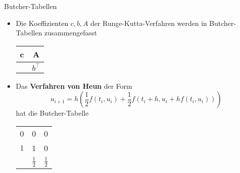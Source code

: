 \begin{frame}{Butcher-Tabellen}
    \begin{itemize}
        \item<1-> Die Koeffizienten $c,b,A$ der Runge-Kutta-Verfahren werden in Butcher-Tabellen zusammengefasst
        \begin{center}
            \begin{tabular}{c | c}
                c & A \\
                \hline
                & $b^{\intercal}$
            \end{tabular}
        \end{center}
        \item Das \textbf{Verfahren von Heun} der Form
        \[
            u_{i+1}=h\left(\frac{1}{2}f(t_i,u_i)+\frac{1}{2}f(t_i+h,u_i+hf(t_i,u_i))\right)
        \]
        hat die Butcher-Tabelle
        \begin{center}
            \begin{tabular}{c | c c}
                0 & 0 & 0 \\
                $1$ & 1 & 0 \\
                \hline
                & $\frac{1}{2}$ & $\frac{1}{2}$
            \end{tabular}
        \end{center}
    \end{itemize}
\end{frame}


